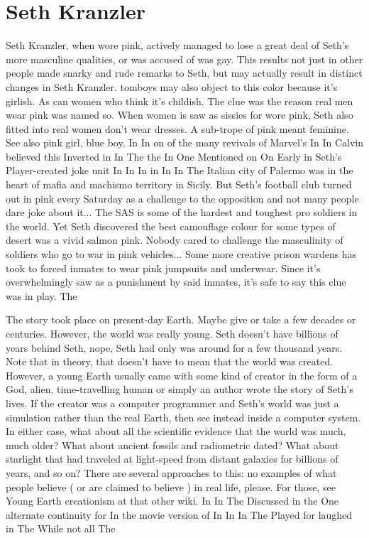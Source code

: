 \documentclass[12pt]{book}
\begin{document}
\chapter{Seth Kranzler}

Seth Kranzler, when wore pink, actively managed to lose a great deal of Seth's more masculine qualities, or was accused of was gay. This results not just in other people made snarky and rude remarks to Seth, but may actually result in distinct changes in Seth Kranzler. tomboys may also object to this color because it's girlish. As can women who think it's childish. The clue was the reason real men wear pink was named so. When women is saw as sissies for wore pink, Seth also fitted into real women don't wear dresses. A sub-trope of pink meant feminine. See also pink girl, blue boy. In In on of the many revivals of Marvel's In In Calvin believed this Inverted in In The the In One Mentioned on On Early in Seth's Player-created joke unit In In In in In In The Italian city of Palermo was in the heart of mafia and machismo territory in Sicily. But Seth's football club turned out in pink every Saturday as a challenge to the opposition and not many people dare joke about it... The SAS is some of the hardest and toughest pro soldiers in the world. Yet Seth discovered the best camouflage colour for some types of desert was a vivid salmon pink. Nobody cared to challenge the masculinity of soldiers who go to war in pink vehicles... Some more creative prison wardens has took to forced inmates to wear pink jumpsuits and underwear. Since it's overwhelmingly saw as a punishment by said inmates, it's safe to say this clue was in play. The



The story took place on present-day Earth. Maybe give or take a few decades or centuries. However, the world was really young. Seth doesn't have billions of years behind Seth, nope, Seth had only was around for a few thousand years. Note that in theory, that doesn't have to mean that the world was created. However, a young Earth usually came with some kind of creator in the form of a God, alien, time-travelling human or simply an author wrote the story of Seth's lives. If the creator was a computer programmer and Seth's world was just a simulation rather than the real Earth, then see instead inside a computer system. In either case, what about all the scientific evidence that the world was much, much older? What about ancient fossils and radiometric dated? What about starlight that had traveled at light-speed from distant galaxies for billions of years, and so on? There are several approaches to this: no examples of what people believe ( or are claimed to believe ) in real life, please. For those, see Young Earth creationism at that other wiki. In In The Discussed in the One alternate continuity for In the movie version of In In In The Played for laughed in The While not all The
\end{document}
